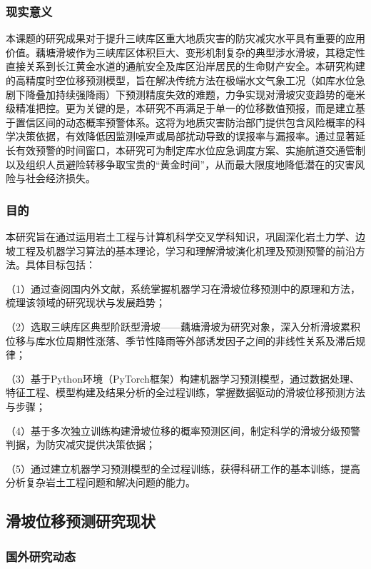 \documentclass[12pt,a4paper]{article}
\begin{document}
\subsubsection{现实意义}

本课题的研究成果对于提升三峡库区重大地质灾害的防灾减灾水平具有重要的应用价值。藕塘滑坡作为三峡库区体积巨大、变形机制复杂的典型涉水滑坡，其稳定性直接关系到长江黄金水道的通航安全及库区沿岸居民的生命财产安全。本研究构建的高精度时空位移预测模型，旨在解决传统方法在极端水文气象工况（如库水位急剧下降叠加持续强降雨）下预测精度失效的难题，力争实现对滑坡灾变趋势的毫米级精准把控。更为关键的是，本研究不再满足于单一的位移数值预报，而是建立基于置信区间的动态概率预警体系。这将为地质灾害防治部门提供包含风险概率的科学决策依据，有效降低因监测噪声或局部扰动导致的误报率与漏报率。通过显著延长有效预警的时间窗口，本研究可为制定库水位应急调度方案、实施航道交通管制以及组织人员避险转移争取宝贵的“黄金时间”，从而最大限度地降低潜在的灾害风险与社会经济损失。

\subsubsection{目的}

本研究旨在通过运用岩土工程与计算机科学交叉学科知识，巩固深化岩土力学、边坡工程及机器学习算法的基本理论，学习和理解滑坡演化机理及预测预警的前沿方法。具体目标包括：

    （1）通过查阅国内外文献，系统掌握机器学习在滑坡位移预测中的原理和方法，梳理该领域的研究现状与发展趋势；

    （2）选取三峡库区典型阶跃型滑坡——藕塘滑坡为研究对象，深入分析滑坡累积位移与库水位周期性涨落、季节性降雨等外部诱发因子之间的非线性关系及滞后规律；

    （3）基于Python环境（PyTorch框架）构建机器学习预测模型，通过数据处理、特征工程、模型构建及结果分析的全过程训练，掌握数据驱动的滑坡位移预测方法与步骤；

    （4）基于多次独立训练构建滑坡位移的概率预测区间，制定科学的滑坡分级预警判据，为防灾减灾提供决策依据；

    （5）通过建立机器学习预测模型的全过程训练，获得科研工作的基本训练，提高分析复杂岩土工程问题和解决问题的能力。

\subsection{滑坡位移预测研究现状}


\subsubsection{国外研究动态}
\end{document}
